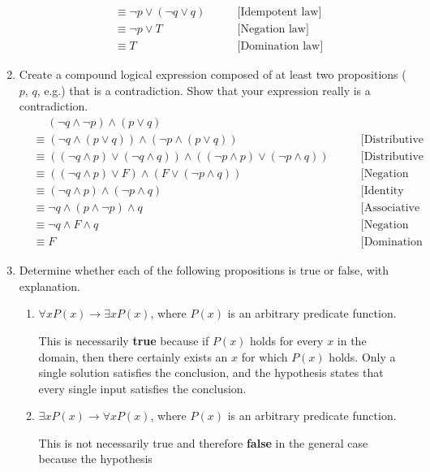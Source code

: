 \documentclass[letterpaper, 12pt]{article}
\newcommand{\then}{\rightarrow}
\begin{document}
\begin{enumerate}
\begin{align*}
    &\equiv \neg p \vee (\neg q \vee q) \qquad
    &\text{[Idempotent law]} \\
    &\equiv \neg p \vee T \qquad
    &\text{[Negation law]} \\
    &\equiv T \qquad
    &\text{[Domination law]}
\end{align*}
\item Create a compound logical expression composed of at least two propositions ($p$, $q$, e.g.)
that is a contradiction. Show that your expression really is a contradiction.
\begin{align*}
    &\quad \; (\neg q \wedge \neg p) \wedge (p \vee q) \\
    &\equiv (\neg q \wedge (p \vee q)) \wedge (\neg p \wedge (p \vee q)) \qquad
    &\text{[Distributive law]} \\
    &\equiv ((\neg q \wedge p) \vee (\neg q \wedge q)) \wedge ((\neg p \wedge p) \vee (\neg p \wedge q)) \qquad
    &\text{[Distributive law]} \\
    &\equiv ((\neg q \wedge p) \vee F) \wedge (F \vee (\neg p \wedge q)) \qquad
    &\text{[Negation law]} \\
    &\equiv (\neg q \wedge p) \wedge (\neg p \wedge q) \qquad
    &\text{[Identity law]} \\
    &\equiv \neg q \wedge (p \wedge \neg p) \wedge q \qquad
    &\text{[Associative law]} \\
    &\equiv \neg q \wedge F \wedge q \qquad
    &\text{[Negation law]} \\
    &\equiv F \qquad
    &\text{[Domination law]}
\end{align*}
\item Determine whether each of the following propositions is true or false, with explanation.
\begin{enumerate}
\item $\forall x P(x) \then \exists x P(x)$, where $P(x)$ is an arbitrary predicate function.
\begin{flushleft}
    This is necessarily \textbf{true} because if $P(x)$ holds for every $x$ in the domain, then there 
    certainly exists an $x$ for which $P(x)$ holds. Only a single solution satisfies the
    conclusion, and the hypothesis states that every single input satisfies the conclusion.
\end{flushleft}
\item $\exists x P(x) \then \forall x P(x)$, where $P(x)$ is an arbitrary predicate function.
\begin{flushleft}
    This is not necessarily true and therefore \textbf{false} in the general case because the hypothesis

\end{flushleft}
\end{enumerate}
\end{enumerate}
\end{document}
